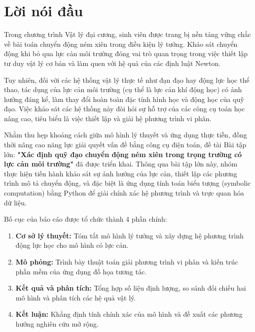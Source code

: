 \documentclass[a4paper]{article}
\begin{document}
\newpage
\tableofcontents
\thispagestyle{empty}
\newpage
\listoffigures
{} 
\thispagestyle{empty}
\newpage
\setcounter{page}{1}

\section*{Lời nói đầu}

Trong chương trình Vật lý đại cương, sinh viên được trang bị nền tảng vững chắc về bài toán chuyển động ném xiên trong điều kiện lý tưởng. Khảo sát chuyển động khi bỏ qua lực cản môi trường đóng vai trò quan trọng trong việc thiết lập tư duy vật lý cơ bản và làm quen với hệ quả của các định luật Newton. 

Tuy nhiên, đối với các hệ thống vật lý thực tế như đạn đạo hay động lực học thể thao, tác dụng của lực cản môi trường (cụ thể là lực cản khí động học) có ảnh hưởng đáng kể, làm thay đổi hoàn toàn đặc tính hình học và động học của quỹ đạo. Việc khảo sát các hệ thống này đòi hỏi sự hỗ trợ của các công cụ toán học nâng cao, tiêu biểu là việc thiết lập và giải hệ phương trình vi phân.

Nhằm thu hẹp khoảng cách giữa mô hình lý thuyết và ứng dụng thực tiễn, đồng thời nâng cao năng lực giải quyết vấn đề bằng công cụ điện toán, đề tài Bài tập lớn: \textbf{"Xác định quỹ đạo chuyển động ném xiên trong trọng trường có lực cản môi trường"} đã được triển khai. Thông qua bài tập lớn này, nhóm thực hiện tiến hành khảo sát sự ảnh hưởng của lực cản, thiết lập các phương trình mô tả chuyển động, và đặc biệt là ứng dụng tính toán biểu tượng (symbolic computation) bằng Python để giải chính xác hệ phương trình và trực quan hóa dữ liệu.

Bố cục của báo cáo được tổ chức thành 4 phần chính:
\begin{enumerate}[nosep]
    \item \textbf{Cơ sở lý thuyết:} Tóm tắt mô hình lý tưởng và xây dựng hệ phương trình động lực học cho mô hình có lực cản.
    \item \textbf{Mô phỏng:} Trình bày thuật toán giải phương trình vi phân và kiến trúc phần mềm của ứng dụng đồ họa tương tác.
    \item \textbf{Kết quả và phân tích:} Tổng hợp số liệu định lượng, so sánh đối chiếu hai mô hình và phân tích các hệ quả vật lý.
    \item \textbf{Kết luận:} Khẳng định tính chính xác của mô hình và đề xuất các phương hướng nghiên cứu mở rộng.
\end{enumerate}
\end{document}
